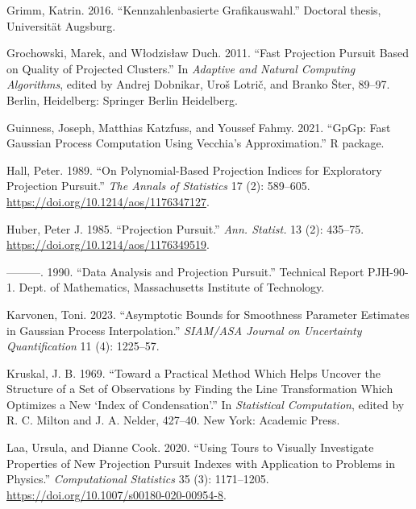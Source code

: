 \documentclass[
  12pt,
]{interact}
\newlength{\cslhangindent}
\newlength{\cslentryspacingunit} %
\newenvironment{CSLReferences}[2] %
 {%
  \setlength{\parindent}{0pt}
  \ifodd #1
  \let\oldpar\par
  \def\par{\hangindent=\cslhangindent\oldpar}
  \fi
  \setlength{\parskip}{#2\cslentryspacingunit}
 }%
 {}
\theoremstyle{plain}
\begin{document}
\begin{CSLReferences}{1}{0}
\leavevmode{}%
Grimm, Katrin. 2016. {``Kennzahlenbasierte Grafikauswahl.''} Doctoral
thesis, Universit{ä}t Augsburg.

\leavevmode{}%
Grochowski, Marek, and Włodzisław Duch. 2011. {``Fast Projection Pursuit
Based on Quality of Projected Clusters.''} In \emph{Adaptive and Natural
Computing Algorithms}, edited by Andrej Dobnikar, Uroš Lotrič, and
Branko Šter, 89--97. Berlin, Heidelberg: Springer Berlin Heidelberg.

\leavevmode{}%
Guinness, Joseph, Matthias Katzfuss, and Youssef Fahmy. 2021. {``{GpGp}:
Fast {G}aussian Process Computation Using {V}ecchia's Approximation.''}
R package.

\leavevmode{}%
Hall, Peter. 1989. {``On Polynomial-Based Projection Indices for
Exploratory Projection Pursuit.''} \emph{The Annals of Statistics} 17
(2): 589--605. \url{https://doi.org/10.1214/aos/1176347127}.

\leavevmode{}%
Huber, Peter J. 1985. {``Projection Pursuit.''} \emph{Ann. Statist.} 13
(2): 435--75. \url{https://doi.org/10.1214/aos/1176349519}.

\leavevmode{}%
---------. 1990. {``Data Analysis and Projection Pursuit.''} Technical
Report PJH-90-1. Dept. of Mathematics, Massachusetts Institute of
Technology.

\leavevmode{}%
Karvonen, Toni. 2023. {``Asymptotic Bounds for Smoothness Parameter
Estimates in {G}aussian Process Interpolation.''} \emph{SIAM/ASA Journal
on Uncertainty Quantification} 11 (4): 1225--57.

\leavevmode{}%
Kruskal, J. B. 1969. {``Toward a Practical Method Which Helps Uncover
the Structure of a Set of Observations by Finding the Line
Transformation Which Optimizes a New {`Index of Condensation'}.''} In
\emph{Statistical Computation}, edited by R. C. Milton and J. A. Nelder,
427--40. New York: Academic Press.

\leavevmode{}%
Laa, Ursula, and Dianne Cook. 2020. {``Using Tours to Visually
Investigate Properties of New Projection Pursuit Indexes with
Application to Problems in Physics.''} \emph{Computational Statistics}
35 (3): 1171--1205. \url{https://doi.org/10.1007/s00180-020-00954-8}.


\end{CSLReferences}
\end{document}
